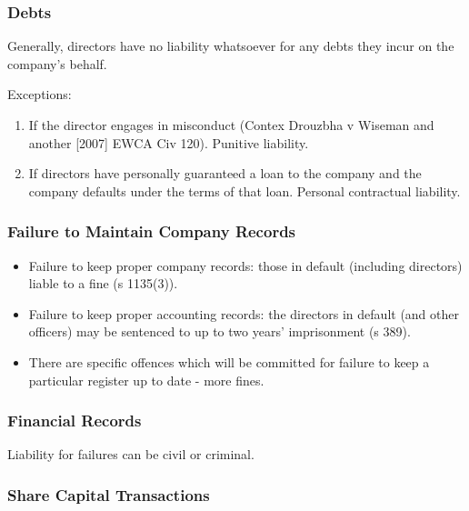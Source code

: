 \documentclass[
]{article}
\providecommand{\tightlist}{%
  \setlength{\itemsep}{0pt}\setlength{\parskip}{0pt}}
\begin{document}
\hypertarget{debts}{%
\subsubsection{Debts}\label{debts}}

Generally, directors have no liability whatsoever for any debts they
incur on the company's behalf.

Exceptions:

\begin{enumerate}
\tightlist
\item
  If the director engages in misconduct (Contex Drouzbha v Wiseman and
  another {[}2007{]} EWCA Civ 120). Punitive liability.
\item
  If directors have personally guaranteed a loan to the company and the
  company defaults under the terms of that loan. Personal contractual
  liability.
\end{enumerate}

\hypertarget{failure-to-maintain-company-records}{%
\subsubsection{Failure to Maintain Company
Records}\label{failure-to-maintain-company-records}}

\begin{itemize}
\tightlist
\item
  Failure to keep proper company records: those in default (including
  directors) liable to a fine (s 1135(3)).
\item
  Failure to keep proper accounting records: the directors in default
  (and other officers) may be sentenced to up to two years' imprisonment
  (s 389).
\item
  There are specific offences which will be committed for failure to
  keep a particular register up to date - more fines.
\end{itemize}

\hypertarget{financial-records}{%
\subsubsection{Financial Records}\label{financial-records}}

Liability for failures can be civil or criminal.

\hypertarget{share-capital-transactions}{%
\subsubsection{Share Capital
Transactions}\label{share-capital-transactions}}
\end{document}

